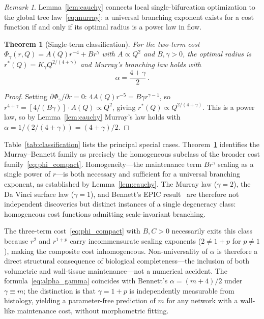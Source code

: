 \documentclass[11pt,a4paper]{article}
\newtheorem{theorem}{Theorem}
\theoremstyle{remark}
\newtheorem{remark}{Remark}
\begin{document}
\begin{remark}
Lemma~\ref{lem:cauchy} connects local single-bifurcation optimization to the
global tree law~\eqref{eq:murray}: a universal branching exponent exists for
a cost function if and only if its optimal radius is a power law in flow.
\end{remark}

\begin{theorem}[Single-term classification]
\label{thm:single}
For the two-term cost $\Phi_\gamma(r,Q)=A(Q)r^{-4}+Br^\gamma$ with $A\propto
Q^2$
and $B,\gamma>0$, the optimal radius is
$r^*(Q)=K_\gamma Q^{2/(4+\gamma)}$ and Murray's branching law holds with
\begin{equation}
  \boxed{\alpha = \frac{4+\gamma}{2}\,.}
  \label{eq:alpha_gamma}
\end{equation}
\end{theorem}

\begin{proof}
Setting $\partial\Phi_\gamma/\partial r=0$:
$4A(Q)r^{-5}=B\gamma r^{\gamma-1}$, so
$r^{4+\gamma}=[4/(B\gamma)]\cdot A(Q)\propto Q^2$,
giving $r^*(Q)\propto Q^{2/(4+\gamma)}$.
This is a power law, so by Lemma~\ref{lem:cauchy} Murray's law holds with
$\alpha=1/(2/(4+\gamma))=(4+\gamma)/2$.
\end{proof}

Table~\ref{tab:classification} lists the principal special cases.
Theorem~\ref{thm:single} identifies the Murray--Bennett family as precisely the
homogeneous subclass of the broader cost family~\eqref{eq:phi_compact}.
Homogeneity---the maintenance term $Br^\gamma$ scaling as a single power of
$r$---is both necessary and sufficient for a universal branching exponent, as
established by Lemma~\ref{lem:cauchy}. The Murray law ($\gamma=2$), the Da Vinci
surface law ($\gamma=1$), and Bennett's EPIC result~\cite{bennett2025} are
therefore
not independent discoveries but distinct instances of a single degeneracy class:
homogeneous cost functions admitting scale-invariant branching.

The three-term cost~\eqref{eq:phi_compact} with $B,C > 0$ necessarily exits this
class because $r^2$ and $r^{1+p}$ carry incommensurate scaling exponents
($2 \neq 1+p$ for $p\neq1$), making the composite cost inhomogeneous.
Non-universality of $\alpha$ is therefore a direct structural
consequence of biological completeness---the inclusion of both volumetric and
wall-tissue maintenance---not a numerical accident. The
formula~\eqref{eq:alpha_gamma}
coincides with Bennett's $\alpha=(m+4)/2$ under $\gamma\equiv m$; the
distinction
is that $\gamma=1+p$ is independently measurable from histology, yielding a
parameter-free prediction of $m$ for any network with a wall-like maintenance
cost,
without morphometric fitting.
\end{document}

